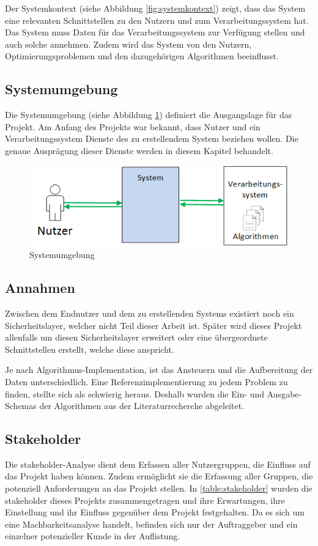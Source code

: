 Der Systemkontext (siehe Abbildung \ref{fig:systemkontext}) zeigt, dass das System eine relevanten Schnittstellen zu den Nutzern und zum Verarbeitungssystem hat. Das System muss Daten 
für das Verarbeitungssystem zur Verfügung stellen und auch solche annehmen. Zudem wird das System von den Nutzern, Optimierungsproblemen und den dazugehörigen Algorithmen 
beeinflusst.

\FloatBarrier
\subsection{Systemumgebung}\label{systemumgebung}
Die Systemumgebung (siehe Abbildung \ref{fig:systemumgebung}) definiert die Ausgangslage für das Projekt. Am Anfang des Projekts war bekannt, dass Nutzer und ein Verarbeitungssystem 
Dienste des zu erstellendem System beziehen wollen. Die genaue Ausprägung dieser Dienste werden in diesem Kapitel behandelt.

\begin{figure}[h]
\centering
\includegraphics[scale=0.8]{images/visio/systemumgebung.png}
\caption[Systemumgebung]{Systemumgebung \selfmade{}}
\label{fig:systemumgebung}
\end{figure}

\FloatBarrier
\subsection{Annahmen}\label{annahmen}
Zwischen dem Endnutzer und dem zu erstellenden Systems existiert noch ein Sicherheitslayer, welcher nicht Teil dieser Arbeit ist. Später wird dieses Projekt allenfalls um diesen Sicherheitslayer 
erweitert oder eine übergeordnete Schnittstellen erstellt, welche diese anspricht. 

Je nach Algorithmus-Implementation, ist das Ansteuern und die Aufbereitung der Daten unterschiedlich. Eine Referenzimplementierung zu jedem Problem zu finden, stellte sich als schwierig 
heraus. Deshalb wurden die Ein- und Ausgabe-Schemas der Algorithmen aus der Literaturrecherche abgeleitet.

\newpage
\subsection{Stakeholder}\label{stakeholder}
Die \gls{stakeholder}-Analyse dient dem Erfassen aller Nutzergruppen, die Einfluss auf das Projekt haben können. Zudem ermöglicht sie die Erfassung aller Gruppen, die potenziell 
Anforderungen an das Projekt stellen. In \autoref{table:stakeholder} wurden die \gls{stakeholder} dieses Projekts zusammengetragen und ihre Erwartungen, ihre 
Einstellung und ihr Einfluss gegenüber dem Projekt festgehalten. Da es sich um eine Machbarkeitsanalyse handelt, befinden sich nur der Auftraggeber und ein einzelner potenzieller Kunde in der 
Auflistung.

